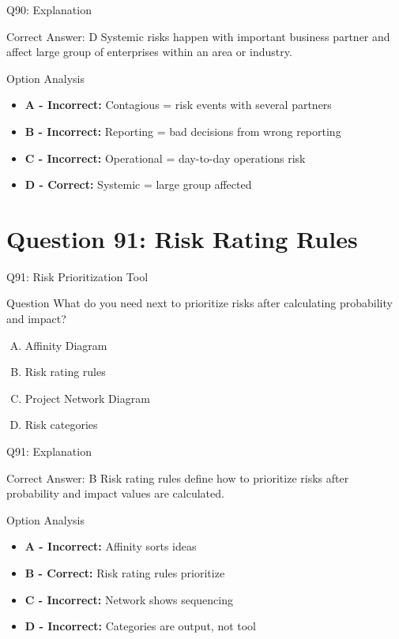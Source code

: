 \documentclass{beamer}
\begin{document}
	\begin{frame}{Q90: Explanation}
		\begin{block}{Correct Answer: D}
			Systemic risks happen with important business partner and affect large group of enterprises within an area or industry.
		\end{block}
		\begin{block}{Option Analysis}
			\begin{itemize}
				\item \textbf{A - Incorrect:} Contagious = risk events with several partners
				\item \textbf{B - Incorrect:} Reporting = bad decisions from wrong reporting
				\item \textbf{C - Incorrect:} Operational = day-to-day operations risk
				\item \textbf{D - Correct:} Systemic = large group affected
			\end{itemize}
		\end{block}
	\end{frame}
	
	\section{Question 91: Risk Rating Rules}
	
	\begin{frame}{Q91: Risk Prioritization Tool}
		\begin{block}{Question}
			What do you need next to prioritize risks after calculating probability and impact?
		\end{block}
		\begin{enumerate}[(A)]
			\item Affinity Diagram
			\item Risk rating rules
			\item Project Network Diagram
			\item Risk categories
		\end{enumerate}
	\end{frame}
	
	\begin{frame}{Q91: Explanation}
		\begin{block}{Correct Answer: B}
			Risk rating rules define how to prioritize risks after probability and impact values are calculated.
		\end{block}
		\begin{block}{Option Analysis}
			\begin{itemize}
				\item \textbf{A - Incorrect:} Affinity sorts ideas
				\item \textbf{B - Correct:} Risk rating rules prioritize
				\item \textbf{C - Incorrect:} Network shows sequencing
				\item \textbf{D - Incorrect:} Categories are output, not tool
			\end{itemize}
		\end{block}
	\end{frame}
	
\end{document}
